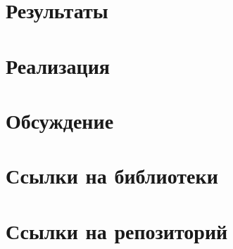\documentclass[14pt,a4paper,article]{ncc}
\begin{document}
\section{Результаты}




\newpage

\section{Реализация}

\newpage

\section{Обсуждение}




\newpage

\section{Ссылки на библиотеки}

\newpage

\section{Ссылки на репозиторий}

\end{document}

